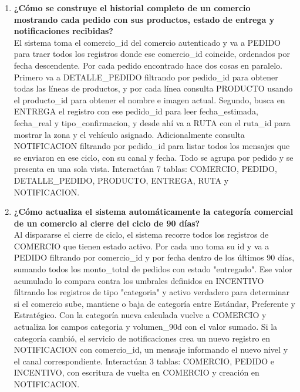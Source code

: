 \documentclass[12pt, a4paper]{report}
\begin{document}
\begin{enumerate}
    \item \textbf{¿Cómo se construye el historial completo de un comercio mostrando cada pedido con sus productos, estado de entrega y notificaciones recibidas?} \\
    El sistema toma el comercio\_id del comercio autenticado y va a PEDIDO para traer todos los registros donde ese comercio\_id coincide, ordenados por fecha descendente. Por cada pedido encontrado hace dos cosas en paralelo. Primero va a DETALLE\_PEDIDO filtrando por pedido\_id para obtener todas las líneas de productos, y por cada línea consulta PRODUCTO usando el producto\_id para obtener el nombre e imagen actual. Segundo, busca en ENTREGA el registro con ese pedido\_id para leer fecha\_estimada, fecha\_real y tipo\_confirmacion, y desde ahí va a RUTA con el ruta\_id para mostrar la zona y el vehículo asignado. Adicionalmente consulta NOTIFICACION filtrando por pedido\_id para listar todos los mensajes que se enviaron en ese ciclo, con su canal y fecha. Todo se agrupa por pedido y se presenta en una sola vista. Interactúan 7 tablas: COMERCIO, PEDIDO, DETALLE\_PEDIDO, PRODUCTO, ENTREGA, RUTA y NOTIFICACION.

    \item \textbf{¿Cómo actualiza el sistema automáticamente la categoría comercial de un comercio al cierre del ciclo de 90 días?} \\
    Al dispararse el cierre de ciclo, el sistema recorre todos los registros de COMERCIO que tienen estado activo. Por cada uno toma su id y va a PEDIDO filtrando por comercio\_id y por fecha dentro de los últimos 90 días, sumando todos los monto\_total de pedidos con estado "entregado". Ese valor acumulado lo compara contra los umbrales definidos en INCENTIVO filtrando los registros de tipo "categoria" y activo verdadero para determinar si el comercio sube, mantiene o baja de categoría entre Estándar, Preferente y Estratégico. Con la categoría nueva calculada vuelve a COMERCIO y actualiza los campos categoria y volumen\_90d con el valor sumado. Si la categoría cambió, el servicio de notificaciones crea un nuevo registro en NOTIFICACION con comercio\_id, un mensaje informando el nuevo nivel y el canal correspondiente. Interactúan 3 tablas: COMERCIO, PEDIDO e INCENTIVO, con escritura de vuelta en COMERCIO y creación en NOTIFICACION.


\end{enumerate}
\end{document}
